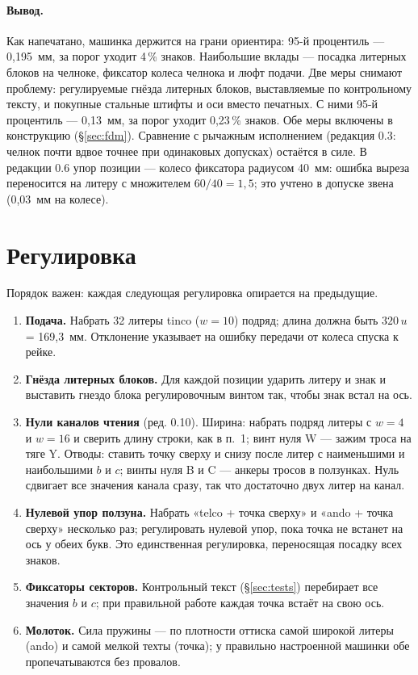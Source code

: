 \paragraph{Вывод.}\sloppy{} Как напечатано, машинка держится на грани ориентира: 95-й процентиль — 0,195~мм, за порог уходит 4\,\% знаков. Наибольшие вклады — посадка литерных блоков на челноке, фиксатор колеса челнока и люфт подачи. Две меры снимают проблему: регулируемые гнёзда литерных блоков, выставляемые по контрольному тексту, и покупные стальные штифты и оси вместо печатных. С ними 95-й процентиль — 0,13~мм, за порог уходит 0,23\,\% знаков. Обе меры включены в конструкцию (\S\ref{sec:fdm}). Сравнение с рычажным исполнением (редакция 0.3: челнок почти вдвое точнее при одинаковых допусках) остаётся в силе. В редакции 0.6 упор позиции — колесо фиксатора радиусом 40~мм: ошибка выреза переносится на литеру с множителем $60/40 = 1{,}5$; это учтено в допуске звена (0,03~мм на колесе).

\section{Регулировка}
\label{sec:adjust}

Порядок важен: каждая следующая регулировка опирается на предыдущие.

\begin{enumerate}
  \item \textbf{Подача.} Набрать 32 литеры tinco ($w = 10$) подряд; длина должна быть $320\,u$ = 169,3~мм. Отклонение указывает на ошибку передачи от колеса спуска к рейке.
  \item \textbf{Гнёзда литерных блоков.} Для каждой позиции ударить литеру и знак и выставить гнездо блока регулировочным винтом так, чтобы знак встал на ось.
  \item \textbf{Нули каналов чтения} (ред. 0.10). Ширина: набрать подряд литеры с $w = 4$ и $w = 16$ и сверить длину строки, как в п.~1; винт нуля W — зажим троса на тяге Y. Отводы: ставить точку сверху и снизу после литер с наименьшими и наибольшими $b$ и $c$; винты нуля B и C — анкеры тросов в ползунках. Нуль сдвигает все значения канала сразу, так что достаточно двух литер на канал.
  \item \textbf{Нулевой упор ползуна.} Набрать «telco + точка сверху» и «ando + точка сверху» несколько раз; регулировать нулевой упор, пока точка не встанет на ось у обеих букв. Это единственная регулировка, переносящая посадку всех знаков.
  \item \textbf{Фиксаторы секторов.} Контрольный текст (\S\ref{sec:tests}) перебирает все значения $b$ и $c$; при правильной работе каждая точка встаёт на свою ось.
  \item \textbf{Молоток.} Сила пружины — по плотности оттиска самой широкой литеры (ando) и самой мелкой техты (точка); у правильно настроенной машинки обе пропечатываются без провалов.
\end{enumerate}

